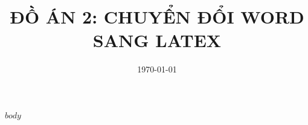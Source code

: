 \documentclass[12pt,a4paper]{article}
\title{\textbf{ĐỒ ÁN 2: CHUYỂN ĐỔI WORD SANG LATEX}}
\date{\today}
\begin{document}
\maketitle
\tableofcontents
\newpage

$body$
\end{document}
